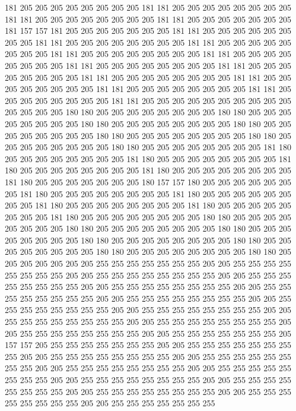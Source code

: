 181 205 205 205 205 205 205 205 205 181 181 205 205 205 205 205 205 205 205 181
181 205 205 205 205 205 205 205 205 181 181 205 205 205 205 205 205 205 181 157
157 181 205 205 205 205 205 205 205 181 181 205 205 205 205 205 205 205 205 181
181 205 205 205 205 205 205 205 205 181 181 205 205 205 205 205 205 205 205 181
181 205 205 205 205 205 205 205 205 181 181 205 205 205 205 205 205 205 205 181
181 205 205 205 205 205 205 205 205 181 181 205 205 205 205 205 205 205 205 181
181 205 205 205 205 205 205 205 205 181 181 205 205 205 205 205 205 205 205 181
181 205 205 205 205 205 205 205 205 181 181 205 205 205 205 205 205 205 205 181
181 205 205 205 205 205 205 205 205 205 205 205 205 205 205 180 180 205 205 205
205 205 205 205 205 180 180 205 205 205 205 205 205 205 205 180 180 205 205 205
205 205 205 205 205 180 180 205 205 205 205 205 205 205 205 180 180 205 205 205
205 205 205 205 205 180 180 205 205 205 205 205 205 205 205 180 180 205 205 205
205 205 205 205 205 181 180 205 205 205 205 205 205 205 205 181 180 205 205 205
205 205 205 205 205 181 180 205 205 205 205 205 205 205 205 181 180 205 205 205
205 205 205 205 205 181 180 205 205 205 205 205 205 205 180 157 157 180 205 205
205 205 205 205 205 181 180 205 205 205 205 205 205 205 205 181 180 205 205 205
205 205 205 205 205 181 180 205 205 205 205 205 205 205 205 181 180 205 205 205
205 205 205 205 205 181 180 205 205 205 205 205 205 205 205 180 180 205 205 205
205 205 205 205 205 180 180 205 205 205 205 205 205 205 205 180 180 205 205 205
205 205 205 205 205 180 180 205 205 205 205 205 205 205 205 180 180 205 205 205
205 205 205 205 205 180 180 205 205 205 205 205 205 205 205 180 180 205 205 205
205 205 205 205 255 255 255 255 255 255 255 205 205 255 255 255 255 255 255 255
255 205 205 255 255 255 255 255 255 255 255 205 205 255 255 255 255 255 255 255
255 205 205 255 255 255 255 255 255 255 255 205 205 255 255 255 255 255 255 255
255 205 205 255 255 255 255 255 255 255 255 205 205 255 255 255 255 255 255 255
255 205 205 255 255 255 255 255 255 255 255 205 205 255 255 255 255 255 255 255
255 205 205 255 255 255 255 255 255 255 255 205 205 255 255 255 255 255 255 255
255 205 205 255 255 255 255 255 255 255 205 157 157 205 255 255 255 255 255 255
255 205 205 255 255 255 255 255 255 255 255 205 205 255 255 255 255 255 255 255
255 205 205 255 255 255 255 255 255 255 255 205 205 255 255 255 255 255 255 255
255 205 205 255 255 255 255 255 255 255 255 205 205 255 255 255 255 255 255 255
255 205 205 255 255 255 255 255 255 255 255 205 205 255 255 255 255 255 255 255
255 205 205 255 255 255 255 255 255 255 255 205 205 255 255 255 255 255 255 255
